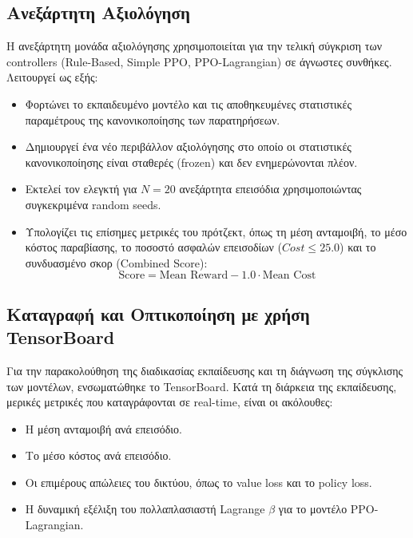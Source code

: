 \documentclass[acmsmall,screen,nonacm]{acmart}
\begin{document}
	\subsection{Ανεξάρτητη Αξιολόγηση}
	Η ανεξάρτητη μονάδα αξιολόγησης χρησιμοποιείται για την τελική σύγκριση των controllers (Rule-Based, Simple PPO, PPO-Lagrangian) σε άγνωστες συνθήκες. Λειτουργεί ως εξής:
	\begin{itemize}
		\item Φορτώνει το εκπαιδευμένο μοντέλο και τις αποθηκευμένες στατιστικές παραμέτρους της κανονικοποίησης των παρατηρήσεων.
		\item Δημιουργεί ένα νέο περιβάλλον αξιολόγησης στο οποίο οι στατιστικές κανονικοποίησης είναι σταθερές (frozen) και δεν ενημερώνονται πλέον.
		\item Εκτελεί τον ελεγκτή για $N=20$ ανεξάρτητα επεισόδια χρησιμοποιώντας συγκεκριμένα random seeds.
		\item Υπολογίζει τις επίσημες μετρικές του πρότζεκτ, όπως τη μέση ανταμοιβή, το μέσο κόστος παραβίασης, το ποσοστό ασφαλών επεισοδίων ($Cost \le 25.0$) και το συνδυασμένο σκορ (Combined Score):
		\begin{equation}
			\text{Score} = \text{Mean Reward} - 1.0 \cdot \text{Mean Cost}
		\end{equation}
	\end{itemize}

	\subsection{Καταγραφή και Οπτικοποίηση με χρήση TensorBoard}
	Για την παρακολούθηση της διαδικασίας εκπαίδευσης και τη διάγνωση της σύγκλισης των μοντέλων, ενσωματώθηκε το TensorBoard. Κατά τη διάρκεια της εκπαίδευσης, μερικές μετρικές που καταγράφονται σε real-time, είναι οι ακόλουθες:
	\begin{itemize}
		\item Η μέση ανταμοιβή ανά επεισόδιο.
		\item Το μέσο κόστος ανά επεισόδιο.
		\item Οι επιμέρους απώλειες του δικτύου, όπως το value loss και το policy loss.
		\item Η δυναμική εξέλιξη του πολλαπλασιαστή Lagrange $\beta$ για το μοντέλο PPO-Lagrangian.
	\end{itemize}
\end{document}
